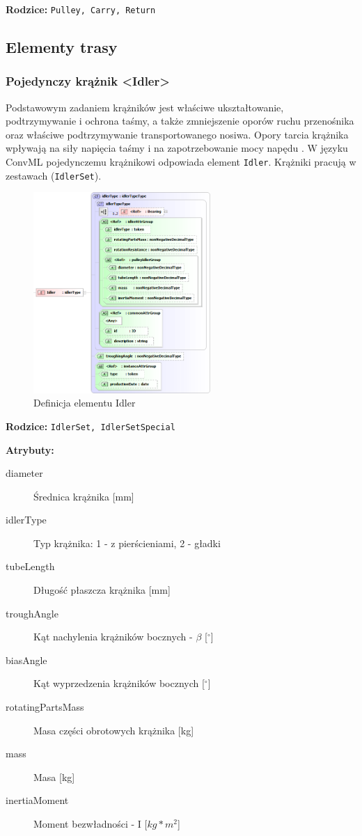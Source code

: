 \documentclass[12pt,a4paper]{article}
\begin{document}
\noindent\textbf{Rodzice:} \texttt{Pulley, Carry, Return}


\subsection{Elementy trasy}

\subsubsection{Pojedynczy krążnik <Idler>}
Podstawowym zadaniem krążników jest właściwe ukształtowanie, podtrzymywanie i
ochrona taśmy, a także zmniejszenie oporów ruchu przenośnika oraz właściwe
podtrzymywanie transportowanego nosiwa.  Opory tarcia krążnika wpływają na siły
napięcia taśmy i na zapotrzebowanie mocy napędu \cite{Antoniak2005}.  W języku
ConvML pojedynczemu krążnikowi odpowiada element {\tt Idler}. Krążniki pracują w
zestawach ({\tt IdlerSet}).

\begin{figure}[H]
  \centering
  \includegraphics[width=0.6\textwidth]{png/liquid/Idler}
  \caption{Definicja elementu Idler}
  \label{fig:idler-xsd}
\end{figure}

\noindent\textbf{Rodzice:} \texttt{IdlerSet, IdlerSetSpecial}

\noindent\textbf{Atrybuty:}
\begin{description}
\item[diameter] Średnica krążnika [mm]
\item[idlerType] Typ krążnika: 1 - z pierścieniami, 2 - gładki
\item[tubeLength] Długość płaszcza krążnika [mm]
\item[troughAngle] Kąt nachylenia krążników bocznych - $\beta$ [$^\circ$]
\item[biasAngle] Kąt wyprzedzenia krążników bocznych [$^\circ$]
\item[rotatingPartsMass] Masa części obrotowych krążnika [kg]
\item[mass] Masa [kg]
\item[inertiaMoment] Moment bezwładności - I [$kg*m^2$]
\end{description}
\end{document}
